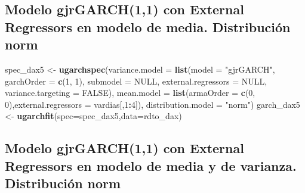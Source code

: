 \documentclass[
  11pt,
]{article}
\newenvironment{Shaded}{\begin{snugshade}}{\end{snugshade}}
\newcommand{\DataTypeTok}[1]{\textcolor[rgb]{0.13,0.29,0.53}{#1}}
\newcommand{\DecValTok}[1]{\textcolor[rgb]{0.00,0.00,0.81}{#1}}
\newcommand{\KeywordTok}[1]{\textcolor[rgb]{0.13,0.29,0.53}{\textbf{#1}}}
\newcommand{\NormalTok}[1]{#1}
\newcommand{\OperatorTok}[1]{\textcolor[rgb]{0.81,0.36,0.00}{\textbf{#1}}}
\newcommand{\OtherTok}[1]{\textcolor[rgb]{0.56,0.35,0.01}{#1}}
\newcommand{\StringTok}[1]{\textcolor[rgb]{0.31,0.60,0.02}{#1}}
\begin{document}
\hypertarget{modelo-gjrgarch11-con-external-regressors-en-modelo-de-media.-distribuciuxf3n-norm}{%
\subsection{Modelo gjrGARCH(1,1) con External Regressors en modelo de
media. Distribución
norm}\label{modelo-gjrgarch11-con-external-regressors-en-modelo-de-media.-distribuciuxf3n-norm}}

\begin{Shaded}
\begin{Highlighting}[]
\NormalTok{spec_dax5 <-}\StringTok{ }\KeywordTok{ugarchspec}\NormalTok{(}\DataTypeTok{variance.model =} \KeywordTok{list}\NormalTok{(}\DataTypeTok{model =} \StringTok{"gjrGARCH"}\NormalTok{, }\DataTypeTok{garchOrder =} \KeywordTok{c}\NormalTok{(}\DecValTok{1}\NormalTok{, }\DecValTok{1}\NormalTok{), }
                    \DataTypeTok{submodel =} \OtherTok{NULL}\NormalTok{, }\DataTypeTok{external.regressors =} \OtherTok{NULL}\NormalTok{, }\DataTypeTok{variance.targeting =} \OtherTok{FALSE}\NormalTok{), }
                    \DataTypeTok{mean.model =} \KeywordTok{list}\NormalTok{(}\DataTypeTok{armaOrder =} \KeywordTok{c}\NormalTok{(}\DecValTok{0}\NormalTok{, }\DecValTok{0}\NormalTok{),}\DataTypeTok{external.regressors =}\NormalTok{ vardias[,}\DecValTok{1}\OperatorTok{:}\DecValTok{4}\NormalTok{]),}
               \DataTypeTok{distribution.model =} \StringTok{"norm"}\NormalTok{)}
\NormalTok{garch_dax5 <-}\StringTok{ }\KeywordTok{ugarchfit}\NormalTok{(}\DataTypeTok{spec=}\NormalTok{spec_dax5,}\DataTypeTok{data=}\NormalTok{rdto_dax)}
\end{Highlighting}
\end{Shaded}

\hypertarget{modelo-gjrgarch11-con-external-regressors-en-modelo-de-media-y-de-varianza.-distribuciuxf3n-norm}{%
\subsection{Modelo gjrGARCH(1,1) con External Regressors en modelo de
media y de varianza. Distribución
norm}\label{modelo-gjrgarch11-con-external-regressors-en-modelo-de-media-y-de-varianza.-distribuciuxf3n-norm}}
\end{document}
